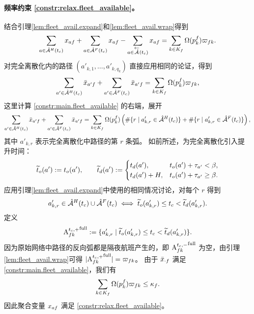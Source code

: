 \paragraph*{频率约束 \eqref{constr:relax.fleet_available}。}
结合引理\ref{lem:fleet_avail.expand}和\ref{lem:fleet_avail.wrap}得到
\[
    \sum_{a\in\holdingArcTc{\checkTime}}\fleetAssignVar_{af}
    + \sum_{a\in\flightArcTc{\checkTime}}\fleetAssignVar_{af}
    - \sum_{a\in\invertArcTc{\checkTime}}\fleetAssignVar_{af}
    =
    \sum_{k\in K_f}\routeAmount{\pathInRoute{f}{k}}\wrapnum_{fk}.
\]
对完全离散化内的路径 $(a'_{k,1},\ldots,a'_{k,q_k})$ 直接应用相同的论证，得到
\[
    \sum_{a'\in\holdingArcTc{\checkTime}}\bar{\fleetAssignVar}_{a'f}
    + \sum_{a'\in\flightArcTc{\checkTime}}\bar{\fleetAssignVar}_{a'f}
    = \sum_{k\in K_f}\routeAmount{\pathInRoute{f}{k}}\wrapnum_{fk},
\]
这里计算 \eqref{constr:main.fleet_available} 的右端，展开
\[
    \sum_{a'\in\holdingArcTc{\checkTime}}\bar{\fleetAssignVar}_{a'f}
    + \sum_{a'\in\flightArcTc{\checkTime}}\bar{\fleetAssignVar}_{a'f}
    = \sum_{k\in K_f}
        \routeAmount{\pathInRoute{f}{k}}
        \left(
            \#\{r \mid a'_{k,r}\in\holdingArcTc{\checkTime}\}
            + \#\{r \mid a'_{k,r}\in\flightArcTc{\checkTime}\}
        \right),
\]
其中 $a'_{k,r}$ 表示完全离散化中路径的第 $r$ 条弧。
如前所述，为完全离散化引入提升时间：
\[
    \widetilde{t}_o(a') := t_o(a'),\qquad
    \widetilde{t}_d(a') :=
    \begin{cases}
        t_d(a'),      & t_o(a')+\travelTime_{a'} < \planningEnd,\\
        t_d(a')+H, & t_o(a')+\travelTime_{a'} \ge \planningEnd.
    \end{cases}
\]
应用引理\ref{lem:fleet_avail.expand}中使用的相同情况讨论，对每个 $r$ 得到
\[
    a'_{k,r}\in\holdingArcTc{\checkTime}\cup\flightArcTc{\checkTime}
    \iff \widetilde{t}_o(a'_{k,r}) \le \checkTime < \widetilde{t}_d(a'_{k,r}).
\]
定义
\[
    \arcPosi^{\mathrm{full}}
        := \{a'_{k,r}\mid \widetilde{t}_o(a'_{k,r}) \le \checkTime < \widetilde{t}_d(a'_{k,r})\}.
\]
因为原始网络中路径的反向弧都是隔夜航班产生的，即 $\arcNega^{\mathrm{full}}$ 为空，由引理\ref{lem:fleet_avail.wrap}可得 $|\arcPosi^{\mathrm{full}}|=\wrapnum_{fk}$。
由于 $\bar{\fleetAssignVar}_{\cdot f}$ 满足 \eqref{constr:main.fleet_available}，我们有
\[
    \sum_{k\in K_f}\routeAmount{\pathInRoute{f}{k}}\wrapnum_{fk}
    \le \fleetAvail_f.
\]
因此聚合变量 $\fleetAssignVar_{af}$ 满足 \eqref{constr:relax.fleet_available}。